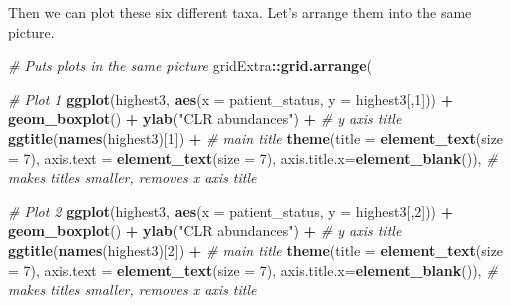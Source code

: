 \documentclass[
  oneside]{book}
\newenvironment{Shaded}{\begin{snugshade}}{\end{snugshade}}
\newcommand{\CommentTok}[1]{\textcolor[rgb]{0.56,0.35,0.01}{\textit{#1}}}
\newcommand{\DataTypeTok}[1]{\textcolor[rgb]{0.13,0.29,0.53}{#1}}
\newcommand{\DecValTok}[1]{\textcolor[rgb]{0.00,0.00,0.81}{#1}}
\newcommand{\KeywordTok}[1]{\textcolor[rgb]{0.13,0.29,0.53}{\textbf{#1}}}
\newcommand{\NormalTok}[1]{#1}
\newcommand{\OperatorTok}[1]{\textcolor[rgb]{0.81,0.36,0.00}{\textbf{#1}}}
\newcommand{\StringTok}[1]{\textcolor[rgb]{0.31,0.60,0.02}{#1}}
\begin{document}
Then we can plot these six different taxa. Let's arrange them into the same picture.

\begin{Shaded}
\begin{Highlighting}[]
\CommentTok{# Puts plots in the same picture}
\NormalTok{gridExtra}\OperatorTok{::}\KeywordTok{grid.arrange}\NormalTok{(}
  
  \CommentTok{# Plot 1}
  \KeywordTok{ggplot}\NormalTok{(highest3, }\KeywordTok{aes}\NormalTok{(}\DataTypeTok{x =}\NormalTok{ patient_status, }\DataTypeTok{y =}\NormalTok{ highest3[,}\DecValTok{1}\NormalTok{])) }\OperatorTok{+}\StringTok{ }
\StringTok{    }\KeywordTok{geom_boxplot}\NormalTok{() }\OperatorTok{+}\StringTok{ }
\StringTok{    }\KeywordTok{ylab}\NormalTok{(}\StringTok{"CLR abundances"}\NormalTok{) }\OperatorTok{+}\StringTok{ }\CommentTok{# y axis title}
\StringTok{    }\KeywordTok{ggtitle}\NormalTok{(}\KeywordTok{names}\NormalTok{(highest3)[}\DecValTok{1}\NormalTok{]) }\OperatorTok{+}\StringTok{ }\CommentTok{# main title}
\StringTok{    }\KeywordTok{theme}\NormalTok{(}\DataTypeTok{title =} \KeywordTok{element_text}\NormalTok{(}\DataTypeTok{size =} \DecValTok{7}\NormalTok{),}
          \DataTypeTok{axis.text =} \KeywordTok{element_text}\NormalTok{(}\DataTypeTok{size =} \DecValTok{7}\NormalTok{),}
          \DataTypeTok{axis.title.x=}\KeywordTok{element_blank}\NormalTok{()), }\CommentTok{# makes titles smaller, removes x axis title}
  
  \CommentTok{# Plot 2}
  \KeywordTok{ggplot}\NormalTok{(highest3, }\KeywordTok{aes}\NormalTok{(}\DataTypeTok{x =}\NormalTok{ patient_status, }\DataTypeTok{y =}\NormalTok{ highest3[,}\DecValTok{2}\NormalTok{])) }\OperatorTok{+}\StringTok{ }
\StringTok{    }\KeywordTok{geom_boxplot}\NormalTok{() }\OperatorTok{+}\StringTok{ }
\StringTok{    }\KeywordTok{ylab}\NormalTok{(}\StringTok{"CLR abundances"}\NormalTok{) }\OperatorTok{+}\StringTok{ }\CommentTok{# y axis title}
\StringTok{    }\KeywordTok{ggtitle}\NormalTok{(}\KeywordTok{names}\NormalTok{(highest3)[}\DecValTok{2}\NormalTok{]) }\OperatorTok{+}\StringTok{ }\CommentTok{# main title}
\StringTok{    }\KeywordTok{theme}\NormalTok{(}\DataTypeTok{title =} \KeywordTok{element_text}\NormalTok{(}\DataTypeTok{size =} \DecValTok{7}\NormalTok{),}
          \DataTypeTok{axis.text =} \KeywordTok{element_text}\NormalTok{(}\DataTypeTok{size =} \DecValTok{7}\NormalTok{),}
          \DataTypeTok{axis.title.x=}\KeywordTok{element_blank}\NormalTok{()), }\CommentTok{# makes titles smaller, removes x axis title}
  

\end{Highlighting}
\end{Shaded}
\end{document}
